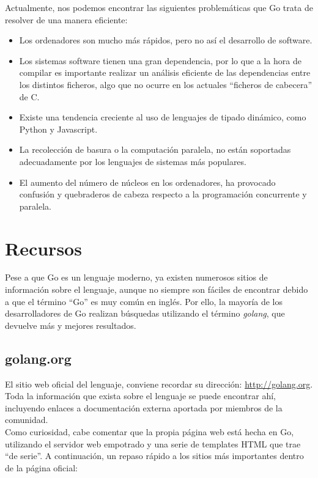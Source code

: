 Actualmente, nos podemos encontrar las siguientes problemáticas que Go trata de
resolver de una manera eficiente:

\begin{itemize} 
	\item Los ordenadores son mucho más rápidos, pero no así el desarrollo de software. 
	\item Los sistemas software tienen una gran dependencia, por lo que a la
	hora de compilar es importante realizar un análisis eficiente de las
	dependencias entre los distintos ficheros, algo que no ocurre en los
	actuales ``ficheros de cabecera'' de C.
	\item Existe una tendencia creciente al uso de lenguajes de tipado dinámico,
	como Python y Javascript.
	\item La recolección de basura o la computación paralela, no están soportadas
	adecuadamente por los lenguajes de sistemas más populares.
	\item El aumento del número de núcleos en los ordenadores, ha provocado
	confusión y quebraderos de cabeza respecto a la programación concurrente y paralela. 
\end{itemize}

\section{Recursos}

Pese a que Go es un lenguaje moderno, ya existen numerosos sitios
de información sobre el lenguaje, aunque no siempre son fáciles de encontrar
debido a que el término ``Go'' es muy común en inglés. Por ello, la mayoría de
los desarrolladores de Go realizan búsquedas utilizando el término
\emph{golang}, que devuelve más y mejores resultados.

	\subsection{golang.org}
	
	El sitio web oficial del lenguaje, conviene recordar su dirección:
	\url{http://golang.org}. Toda la información que exista sobre el
	lenguaje se puede encontrar ahí, incluyendo enlaces a documentación externa
	aportada por miembros de la comunidad.\\
	
	Como curiosidad, cabe comentar que la propia página web está hecha en Go,
	utilizando el servidor web empotrado y una serie de templates HTML que trae
	``de serie''. A continuación, un repaso rápido a los sitios más importantes
	dentro de la página oficial:
	
